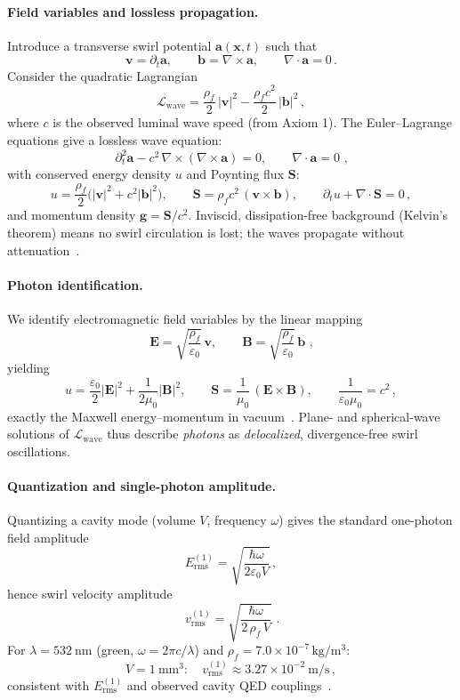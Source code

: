 \documentclass[11pt]{article}
\newcommand{\rhof}{\rho_{\!f}}                           %
\begin{document}
\paragraph{Field variables and lossless propagation.}
    Introduce a transverse swirl potential $\mathbf{a}(\mathbf{x},t)$ such that
    \[
        \mathbf{v} = \partial_t \mathbf{a}, \qquad
        \mathbf{b} = \nabla\times \mathbf{a}, \qquad \nabla\cdot \mathbf{a}=0\,.
    \]
    Consider the quadratic Lagrangian
    \[
        \mathcal{L}_{\text{wave}} = \frac{\rhof}{2}\,|\mathbf{v}|^2 - \frac{\rhof c^2}{2}\,|\mathbf{b}|^2\,,
    \]
    where $c$ is the observed luminal wave speed (from Axiom 1). The Euler–Lagrange equations give a lossless wave equation:
    \[
        \boxed{\,\partial_t^2 \mathbf{a} - c^2\,\nabla\times(\nabla\times \mathbf{a}) = 0, \qquad \nabla\cdot \mathbf{a}=0\,}\,,
    \]
    with conserved energy density $u$ and Poynting flux $\mathbf{S}$:
    \[
        u = \frac{\rhof}{2}\Big(|\mathbf{v}|^2 + c^2|\mathbf{b}|^2\Big), \qquad
        \mathbf{S} = \rhof c^2\,(\mathbf{v}\times \mathbf{b}), \qquad
        \partial_t u + \nabla\cdot \mathbf{S}=0\,,
    \]
    and momentum density $\mathbf{g}=\mathbf{S}/c^2$. Inviscid, dissipation-free background (Kelvin’s theorem) means no swirl circulation is lost; the waves propagate without attenuation~\cite{Batchelor1967,Saffman1992}.

\paragraph{Photon identification.}
    We identify electromagnetic field variables by the linear mapping
    \[
        \boxed{\,\mathbf{E} = \sqrt{\frac{\rhof}{\varepsilon_0}}\,\mathbf{v}, \qquad
        \mathbf{B} = \sqrt{\frac{\rhof}{\varepsilon_0}}\,\mathbf{b}\,}\,,
    \]
    yielding
    \[
        u = \frac{\varepsilon_0}{2}|\mathbf{E}|^2 + \frac{1}{2\mu_0}|\mathbf{B}|^2, \qquad
        \mathbf{S} = \frac{1}{\mu_0}\,(\mathbf{E}\times \mathbf{B}), \qquad
        \frac{1}{\varepsilon_0 \mu_0} = c^2\,,
    \]
    exactly the Maxwell energy–momentum in vacuum~\cite{Jackson1999}. Plane- and spherical-wave solutions of $\mathcal{L}_{\text{wave}}$ thus describe \emph{photons} as \emph{delocalized}, divergence-free swirl oscillations.

\paragraph{Quantization and single-photon amplitude.}
    Quantizing a cavity mode (volume $V$, frequency $\omega$) gives the standard one-photon field amplitude
    \[
        E_{\text{rms}}^{(1)} = \sqrt{\frac{\hbar\omega}{2\varepsilon_0 V}}\,,
    \]
    hence swirl velocity amplitude
    \[
        \boxed{\,v_{\text{rms}}^{(1)} = \sqrt{\frac{\hbar\omega}{2\,\rhof\,V}}\,}\,.
    \]
    For $\lambda = 532~\mathrm{nm}$ (green, $\omega=2\pi c/\lambda$) and $\rhof=7.0\times10^{-7}\,\mathrm{kg/m^3}$:
    \[
        V=1~\mathrm{mm}^3: \quad v_{\text{rms}}^{(1)} \approx 3.27\times10^{-2}\ \mathrm{m/s}\,,
    \]
    consistent with $E_{\text{rms}}^{(1)}$ and observed cavity QED couplings~\cite{HarocheRaimond2006,ScullyZubairy1997}.
\end{document}
